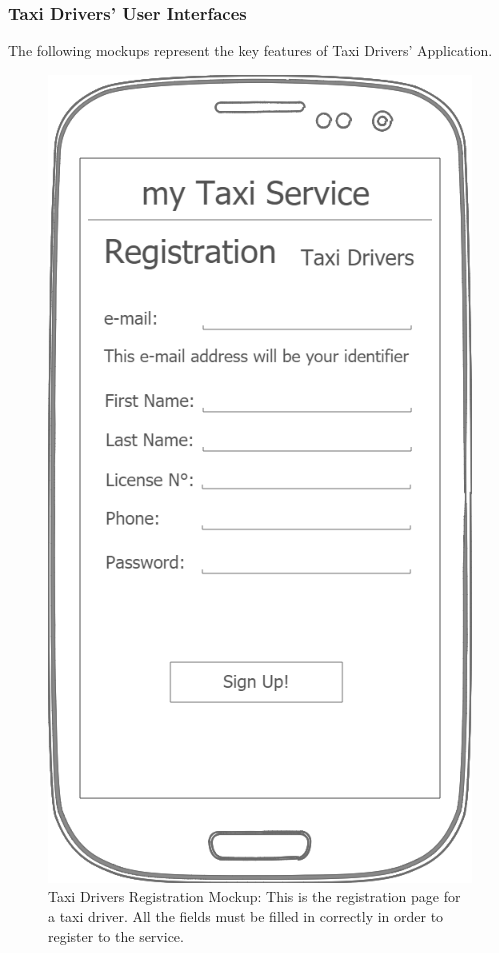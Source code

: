 \documentclass[a4paper]{article}
\begin{document}
\subsubsection{Taxi Drivers' User Interfaces}

The following mockups represent the key features of Taxi Drivers' Application.

\begin{figure}[H]
\includegraphics[width=\mockupWidth]{Mockup-TaxiDriversRegistration}
\centering
\caption[Taxi Drivers Registration Mockup]{Taxi Drivers Registration Mockup: \newline This is the registration page for a taxi driver. All the fields must be filled in correctly in order to register to the service.}
\label{fig:mockuptaxidriverregistration}
\end{figure}
\end{document}
